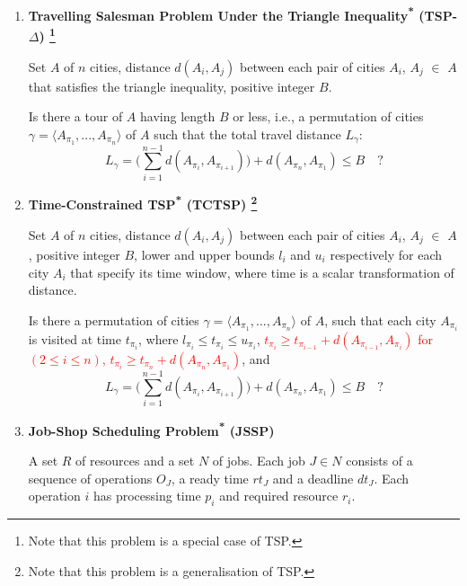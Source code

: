 \documentclass{mprop}
\theoremstyle{definition}
\begin{document}
\begin{enumerate}
\item \textbf{Travelling Salesman Problem Under the Triangle Inequality\textsuperscript{*} (TSP-$\Delta$) \footnote{Note that this problem is a special case of TSP.}}
\begin{instance}
Set $A$ of $n$ cities, distance $d(A_{i}, A_{j})$ between each pair of cities $A_{i}$, $A_{j}$ $\in$ $A$ that satisfies the triangle inequality, positive integer $B$.
\end{instance}

\begin{question}
Is there a tour of $A$ having length $B$ or less, i.e., a permutation of cities $\gamma = \langle A_{\pi_{1}},...,A_{\pi_{n}} \rangle $ of $A$ such that the total travel distance $L_{\gamma}$:
$$L_{\gamma} = \bigg( \sum_{i=1}^{n-1} d(A_{\pi_{i}}, A_{\pi_{i+1}}) \bigg) + d(A_{\pi_{n}}, A_{\pi_{1}}) \leq B \quad \textrm{?}$$
\end{question}

\item \textbf{Time-Constrained TSP\textsuperscript{*} (TCTSP) \footnote{Note that this problem is a generalisation of TSP.}}

\begin{instance}
Set $A$ of $n$ cities, distance $d(A_{i}, A_{j})$ between each pair of cities $A_{i}$, $A_{j}$ $\in$ $A$, positive integer $B$, lower and upper bounds $l_{i}$ and $u_{i}$ respectively for each city $A_{i}$ that specify its time window, where time is a scalar transformation of distance.
\end{instance}

\begin{question}
Is there a permutation of cities $\gamma = \langle A_{\pi_{1}},...,A_{\pi_{n}} \rangle$ of $A$, such that each city $A_{\pi_{i}}$ is visited at time $t_{\pi_{i}}$, where $l_{\pi_{i}} \leq t_{\pi_{i}} \leq u_{\pi_{i}}$, \textcolor{red}{ $t_{\pi_{i}} \geq t_{\pi_{i-1}} + d(A_{\pi_{i-1}},A_{\pi_{i}})$ for $(2 \leq i \leq n)$, $t_{\pi_{i}} \geq t_{\pi_{n}} + d(A_{\pi_{n}},A_{\pi_{1}})$},
 and 
$$L_{\gamma} = \bigg( \sum_{i=1}^{n-1} d(A_{\pi_{i}}, A_{\pi_{i+1}}) \bigg) + d(A_{\pi_{n}}, A_{\pi_{1}}) \leq B \quad \textrm{?}$$

\end{question}

\item \textbf{Job-Shop Scheduling Problem\textsuperscript{*} (JSSP)}
\begin{instance}
A set $R$ of resources and a set $N$ of jobs. Each job $J \in N$ consists of a sequence of operations $O_{J}$, a ready time $rt_{J}$ and a deadline $dt_{J}$. Each operation $i$ has processing time $p_{i}$ and required resource $r_{i}$.
\end{instance}


\end{enumerate}
\end{document}
